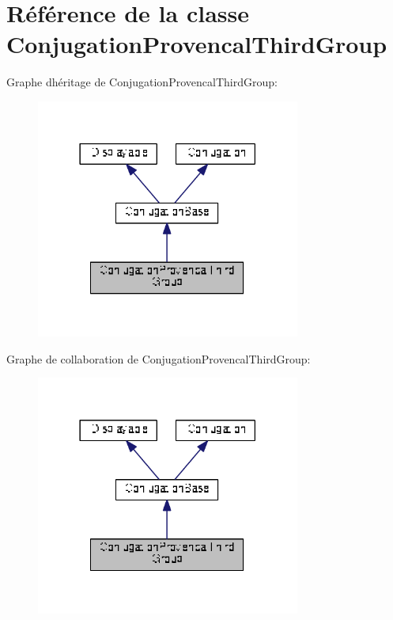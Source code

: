 \hypertarget{class_conjugation_provencal_third_group}{}\section{Référence de la classe Conjugation\+Provencal\+Third\+Group}
\label{class_conjugation_provencal_third_group}


Graphe d\textquotesingle{}héritage de Conjugation\+Provencal\+Third\+Group\+:
\nopagebreak
\begin{figure}[H]
\begin{center}
\leavevmode
\includegraphics[width=246pt]{class_conjugation_provencal_third_group__inherit__graph}
\end{center}
\end{figure}


Graphe de collaboration de Conjugation\+Provencal\+Third\+Group\+:
\nopagebreak
\begin{figure}[H]
\begin{center}
\leavevmode
\includegraphics[width=246pt]{class_conjugation_provencal_third_group__coll__graph}
\end{center}
\end{figure}
